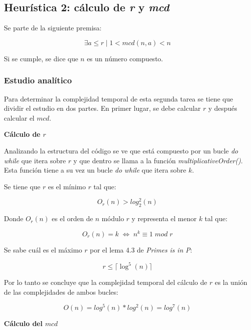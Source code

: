 \documentclass{uc3mpracticas}
\begin{document}
  \subsection{Heurística 2: cálculo de \textit{r} y \textit{mcd}}

  Se parte de la siguiente premisa:

  $$ \exists a \leq r \mid 1 < mcd(n,a) < n $$

  Si se cumple, se dice que $n$ es un número compuesto.


  \subsubsection{Estudio analítico}
  Para determinar la complejidad temporal de esta segunda tarea se tiene que dividir el estudio en dos partes. En primer lugar, se debe calcular $r$ y después calcular el $mcd$.

  \vspace{4mm}

  \textbf{Cálculo de $r$}

  \vspace{2mm}


  Analizando la estructura del código se ve que está compuesto por un bucle \textit{do while} que itera sobre $r$ y que dentro se llama a la función \textit{multiplicativeOrder()}. Esta función tiene a su vez un bucle \textit{do while} que itera sobre $k$.

  \vspace{2mm}

  Se tiene que $r$ es el mínimo $r$ tal que:

  $$ O_r(n) > log_2^2(n) $$

  Donde $O_r(n)$ es el orden de $n$ módulo $r$ y representa el menor $k$ tal que:

  $$ O_r(n) = k \; \Leftrightarrow \; n^k \equiv 1 \; mod \; r$$


  Se sabe cuál es el máximo $r$ por el lema 4.3 de \textit{Primes is in P}\cite{primesinp}:

  $$ r \leq \lceil \log^5(n) \rceil $$

  Por lo tanto se concluye que la complejidad temporal del cálculo de $r$ es la unión de las complejidades de ambos bucles:

  $$ O(n) = log^5(n) * log^2(n) = log^7(n) $$

  \vspace{2mm}

  \textbf{Cálculo del $mcd$}
\end{document}
